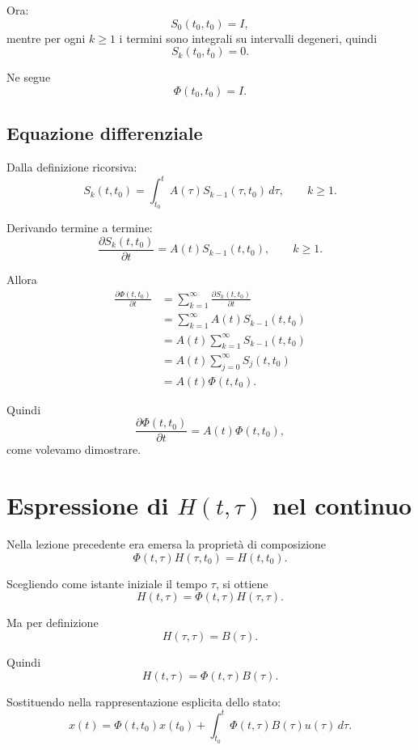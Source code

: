 Ora:
\[
S_0(t_0,t_0)=I,
\]
mentre per ogni $k\ge 1$ i termini sono integrali su intervalli degeneri, quindi
\[
S_k(t_0,t_0)=0.
\]

Ne segue
\begin{equation}
\Phi(t_0,t_0)=I.
\label{eq:L4_Phi_initial}
\end{equation}

\subsection{Equazione differenziale}

Dalla definizione ricorsiva:
\[
S_k(t,t_0)=\int_{t_0}^{t}A(\tau)S_{k-1}(\tau,t_0)\,d\tau,
\qquad k\ge 1.
\]

Derivando termine a termine:
\[
\frac{\partial S_k(t,t_0)}{\partial t}=A(t)S_{k-1}(t,t_0),\qquad k\ge 1.
\]

Allora
\begin{align*}
\frac{\partial \Phi(t,t_0)}{\partial t}
&=
\sum_{k=1}^{\infty}\frac{\partial S_k(t,t_0)}{\partial t}\\
&=
\sum_{k=1}^{\infty}A(t)S_{k-1}(t,t_0)\\
&=
A(t)\sum_{k=1}^{\infty}S_{k-1}(t,t_0)\\
&=
A(t)\sum_{j=0}^{\infty}S_j(t,t_0)\\
&=
A(t)\Phi(t,t_0).
\end{align*}

Quindi
\begin{equation}
\frac{\partial \Phi(t,t_0)}{\partial t}=A(t)\Phi(t,t_0),
\end{equation}
come volevamo dimostrare.

\section{Espressione di \texorpdfstring{$H(t,\tau)$}{H(t,tau)} nel continuo}

Nella lezione precedente era emersa la proprietà di composizione
\[
\Phi(t,\tau)H(\tau,t_0)=H(t,t_0).
\]

Scegliendo come istante iniziale il tempo $\tau$, si ottiene
\[
H(t,\tau)=\Phi(t,\tau)H(\tau,\tau).
\]

Ma per definizione
\[
H(\tau,\tau)=B(\tau).
\]

Quindi
\begin{equation}
H(t,\tau)=\Phi(t,\tau)B(\tau).
\label{eq:L4_H_TC_from_Phi}
\end{equation}

Sostituendo nella rappresentazione esplicita dello stato:
\begin{equation}
x(t)=\Phi(t,t_0)x(t_0)+\int_{t_0}^{t}\Phi(t,\tau)B(\tau)u(\tau)\,d\tau.
\label{eq:L4_explicit_TC_general}
\end{equation}


